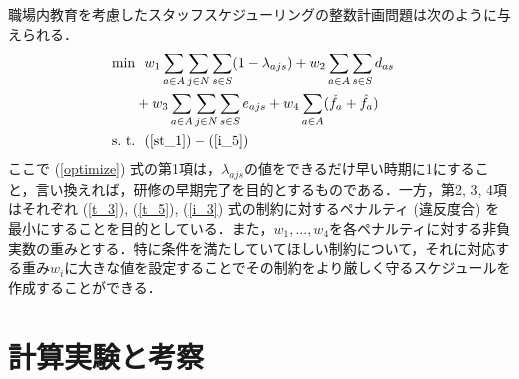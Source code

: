 \documentclass[twocolumn]{jsarticle}
\begin{document}
職場内教育を考慮したスタッフスケジューリングの整数計画問題は次のように与えられる．
\begin{align}
    \min
    &
    \ \ w_1 \sum_{a \in A}\sum_{j \in N}\sum_{s \in S}(1 - \lambda_{ajs}) + w_2 \sum_{a \in A}\sum_{s \in S} d_{as} \nonumber
    & \\ &
    + w_3 \sum_{a \in A}\sum_{j \in N}\sum_{s \in S} e_{ajs} + w_4 \sum_{a \in A}(\check{f_{a}} + \hat{f_{a}})
    \label{optimize}
    \\
    \mathrm{s. \ t. }
    &
    \ \ (\ref{st_1}) - (\ref{i_5})
    \nonumber
\end{align}
ここで (\ref{optimize}) 式の第1項は，$\lambda_{ajs}$の値をできるだけ早い時期に1にすること，言い換えれば，研修の早期完了を目的とするものである．一方，第2, 3, 4項はそれぞれ (\ref{t_3}), (\ref{t_5}), (\ref{i_3}) 式の制約に対するペナルティ (違反度合) を最小にすることを目的としている．また，$w_1, ..., w_4$を各ペナルティに対する非負実数の重みとする．特に条件を満たしていてほしい制約について，それに対応する重み$w_i$に大きな値を設定することでその制約をより厳しく守るスケジュールを作成することができる．

\section{計算実験と考察}
\end{document}
